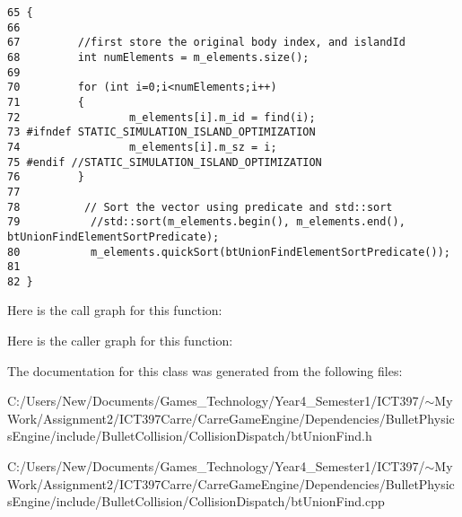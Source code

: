 \begin{Code}\begin{verbatim}65 {
66 
67         //first store the original body index, and islandId
68         int numElements = m_elements.size();
69         
70         for (int i=0;i<numElements;i++)
71         {
72                 m_elements[i].m_id = find(i);
73 #ifndef STATIC_SIMULATION_ISLAND_OPTIMIZATION
74                 m_elements[i].m_sz = i;
75 #endif //STATIC_SIMULATION_ISLAND_OPTIMIZATION
76         }
77         
78          // Sort the vector using predicate and std::sort
79           //std::sort(m_elements.begin(), m_elements.end(), btUnionFindElementSortPredicate);
80           m_elements.quickSort(btUnionFindElementSortPredicate());
81 
82 }
\end{verbatim}
\end{Code}




Here is the call graph for this function:

Here is the caller graph for this function:

The documentation for this class was generated from the following files:\begin{CompactItemize}
\item 
C:/Users/New/Documents/Games\_\-Technology/Year4\_\-Semester1/ICT397/$\sim$My Work/Assignment2/ICT397Carre/CarreGameEngine/Dependencies/BulletPhysicsEngine/include/BulletCollision/CollisionDispatch/btUnionFind.h\item 
C:/Users/New/Documents/Games\_\-Technology/Year4\_\-Semester1/ICT397/$\sim$My Work/Assignment2/ICT397Carre/CarreGameEngine/Dependencies/BulletPhysicsEngine/include/BulletCollision/CollisionDispatch/btUnionFind.cpp\end{CompactItemize}
